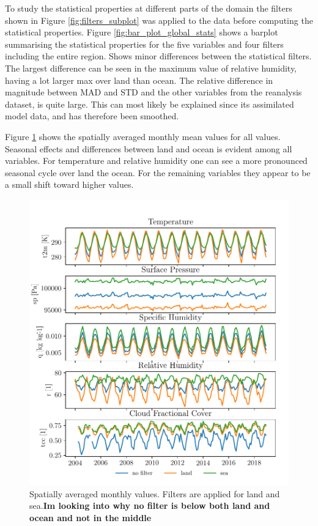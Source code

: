 To study the statistical properties at different parts of the domain the filters shown in Figure \ref{fig:filters_subplot} was applied to the data before computing the statistical properties. Figure \ref{fig:bar_plot_global_stats} shows a barplot summarising the statistical properties for the five variables and four filters including the entire region. Shows minor differences between the statistical filters. The largest difference can be seen in the maximum value of relative humidity, having a lot larger max over land than ocean. The relative difference in magnitude between MAD and STD and the other variables from the reanalysis dataset, is quite large. This can most likely be explained since its assimilated model data, and has therefore been smoothed.

Figure \ref{fig:monthly_mean_ts_vars} shows the spatially averaged monthly mean values for all values. Seasonal effects and differences between land and ocean is evident among all variables. For temperature and relative humidity one can see a more pronounced seasonal cycle over land the ocean. For the remaining variables they appear to be a small shift toward higher values. 
\begin{figure}[ht]
    \centering
    \includegraphics{python_figs/monthly_means.pdf}
    \caption{Spatially averaged monthly values. Filters are applied for land and sea.\textbf{Im looking into why no filter is below both land and ocean and not in the middle}}
    \label{fig:monthly_mean_ts_vars}
\end{figure}

